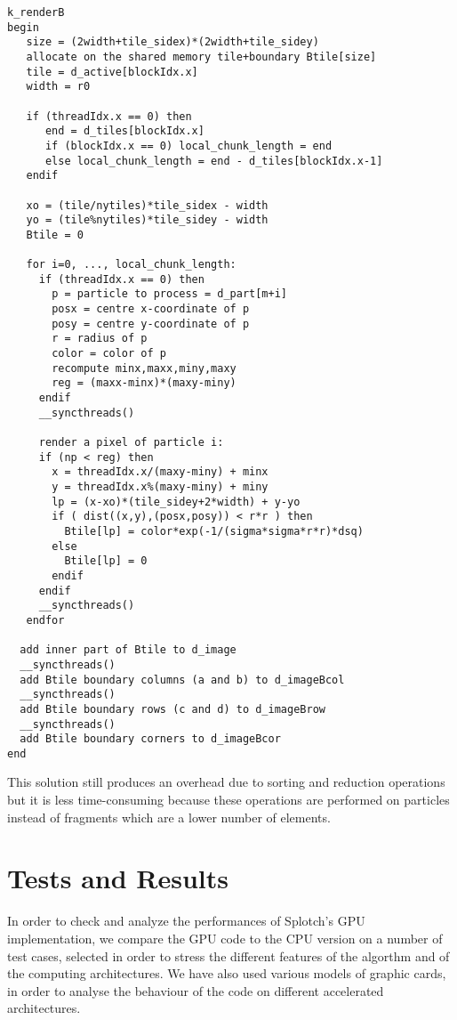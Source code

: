 \documentclass[11pt]{article}
\begin{document}
\begin{verbatim}
k_renderB
begin
   size = (2width+tile_sidex)*(2width+tile_sidey)
   allocate on the shared memory tile+boundary Btile[size]
   tile = d_active[blockIdx.x] 
   width = r0

   if (threadIdx.x == 0) then
      end = d_tiles[blockIdx.x]
      if (blockIdx.x == 0) local_chunk_length = end
      else local_chunk_length = end - d_tiles[blockIdx.x-1]
   endif

   xo = (tile/nytiles)*tile_sidex - width
   yo = (tile%nytiles)*tile_sidey - width
   Btile = 0

   for i=0, ..., local_chunk_length:
     if (threadIdx.x == 0) then
       p = particle to process = d_part[m+i]
       posx = centre x-coordinate of p
       posy = centre y-coordinate of p
       r = radius of p
       color = color of p
       recompute minx,maxx,miny,maxy
       reg = (maxx-minx)*(maxy-miny)
     endif
     __syncthreads()

     render a pixel of particle i:
     if (np < reg) then
       x = threadIdx.x/(maxy-miny) + minx
       y = threadIdx.x%(maxy-miny) + miny
       lp = (x-xo)*(tile_sidey+2*width) + y-yo
       if ( dist((x,y),(posx,posy)) < r*r ) then
         Btile[lp] = color*exp(-1/(sigma*sigma*r*r)*dsq)
       else 
         Btile[lp] = 0
       endif
     endif
     __syncthreads()
   endfor

  add inner part of Btile to d_image 
  __syncthreads()
  add Btile boundary columns (a and b) to d_imageBcol
  __syncthreads()
  add Btile boundary rows (c and d) to d_imageBrow
  __syncthreads()
  add Btile boundary corners to d_imageBcor
end
\end{verbatim}
\normalsize
This solution still produces an overhead due to sorting and reduction operations but it is less time-consuming because these operations are performed on particles instead of fragments which are a lower number of elements.   

\section{Tests and Results}

In order to check and analyze the performances of Splotch's GPU implementation,
we compare the GPU code to the CPU version on a number of test cases, selected in 
order to stress the different features of the algorthm and of the computing 
architectures. We have also used various models of graphic cards, in order to analyse
the behaviour of the code on different accelerated architectures.
\end{document}
